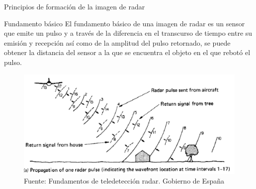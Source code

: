 \begin{frame}{Principios de formación de la imagen de radar}
  \begin{block}{Fundamento básico}
    El fundamento básico de una imagen de radar es un sensor que emite un pulso y a través de la diferencia en el transcurso de tiempo entre su emisión y recepción así como de la amplitud del pulso retornado, se puede obtener la distancia del sensor a la que se encuentra el objeto en el que rebotó el pulso.
  \end{block}

  \begin{figure}
    \begin{center}
      \includegraphics[scale=0.4]{img/section_03/principio_01}
    \end{center}
    \caption{Fuente: Fundamentos de teledetección radar. Gobierno de España}
    \label{fig:resolucion_temporal}
  \end{figure}
\end{frame}

